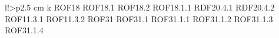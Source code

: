 \begin{tabella}{l!{\VRule}>{\centering\arraybackslash}p{2.5 cm}}
k ROF18 \linebreak ROF18.1 \linebreak ROF18.2 \linebreak ROF18.1.1 \linebreak RDF20.4.1 \linebreak RDF20.4.2 \linebreak ROF11.3.1 \linebreak ROF11.3.2 \linebreak ROF31 \linebreak ROF31.1 \linebreak ROF31.1.1 \linebreak ROF31.1.2 \linebreak ROF31.1.3 \linebreak ROF31.1.4 
\end{tabella}
